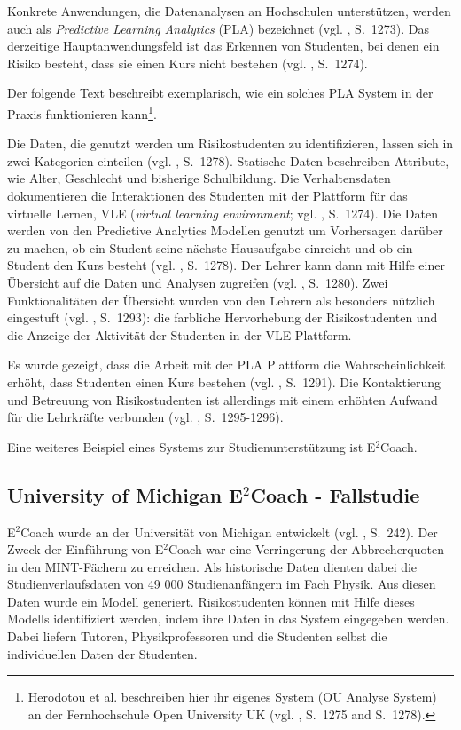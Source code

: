 Konkrete Anwendungen, die Datenanalysen an Hochschulen unterstützen, werden auch als \emph{Predictive Learning Analytics} (PLA)
bezeichnet (vgl. \cite{Herodotou}, S.~1273). Das derzeitige Hauptanwendungsfeld ist das Erkennen von Studenten, bei denen
ein Risiko besteht, dass sie einen Kurs nicht bestehen (vgl. \cite{Herodotou}, S.~1274).

Der folgende Text beschreibt exemplarisch, wie ein solches PLA System in der Praxis funktionieren kann\footnote{
Herodotou et al. beschreiben hier ihr eigenes System (OU Analyse System) an der Fernhochschule Open University UK
(vgl. \cite{Herodotou}, S.~1275 and S.~1278).
}.

Die Daten, die genutzt werden um Risikostudenten zu identifizieren, lassen sich in zwei Kategorien einteilen (vgl. \cite{Herodotou}, S.~1278). 
Statische Daten beschreiben Attribute, wie Alter, Geschlecht und bisherige Schulbildung. Die Verhaltensdaten dokumentieren die Interaktionen
des Studenten mit der Plattform für das virtuelle Lernen, VLE (\emph{virtual learning environment}; vgl. \cite{Herodotou}, S.~1274).
Die Daten werden von den Predictive Analytics Modellen genutzt um Vorhersagen darüber zu machen, ob ein Student seine nächste Hausaufgabe
einreicht und ob ein Student den Kurs besteht (vgl. \cite{Herodotou}, S.~1278). Der Lehrer kann dann mit Hilfe einer Übersicht auf die
Daten und Analysen zugreifen (vgl. \cite{Herodotou}, S.~1280). Zwei Funktionalitäten der Übersicht wurden von den Lehrern als besonders nützlich
eingestuft (vgl. \cite{Herodotou}, S.~1293): die farbliche Hervorhebung der Risikostudenten und die Anzeige der Aktivität der Studenten in
der VLE Plattform.

Es wurde gezeigt, dass die Arbeit mit der PLA Plattform die Wahrscheinlichkeit erhöht, dass Studenten einen Kurs bestehen
(vgl. \cite{Herodotou}, S.~1291). Die Kontaktierung und Betreuung von Risikostudenten ist allerdings mit einem erhöhten Aufwand für
die Lehrkräfte verbunden (vgl. \cite{Herodotou}, S.~1295-1296).

Eine weiteres Beispiel eines Systems zur Studienunterstützung ist E$^2$Coach.

\subsection{University of Michigan E$^2$Coach - Fallstudie}

E$^2$Coach wurde an der Universität von Michigan entwickelt (vgl. \cite{Mattingly}, S.~242).
Der Zweck der Einführung von E$^2$Coach war eine Verringerung der Abbrecherquoten in den
MINT-Fächern zu erreichen. Als historische Daten dienten dabei die Studienverlaufsdaten von
49 000 Studienanfängern im Fach Physik. Aus diesen Daten wurde ein Modell generiert.
Risikostudenten können mit Hilfe dieses Modells identifiziert werden, indem ihre Daten in das
System eingegeben werden. Dabei liefern Tutoren, Physikprofessoren und die Studenten selbst
die individuellen Daten der Studenten.

